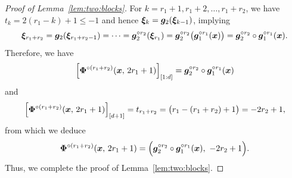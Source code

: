 \documentclass[nohyperref]{article}
\theoremstyle{plain}
\theoremstyle{definition}
\theoremstyle{remark}
\begin{document}
\begin{proof}[Proof of Lemma~\ref{lem:two:blocks}]
		For $k=r_1+1,r_1+2,\dotsc,r_1+r_2$, we have $t_k=2(r_1-k)+1\le -1$ and hence ${\bm{\xi}}_k={\bm{g}}_2({\bm{\xi}}_{k-1})$, implying
		\begin{equation*}
			{\bm{\xi}}_{r_1+r_2}={\bm{g}}_2({\bm{\xi}}_{r_1+r_2-1})=\mathinner{\mkern-0.1mu\cdotp\mkern-0.3mu\cdotp\mkern-0.3mu\cdotp\mkern-0.1mu}={\bm{g}}_2^{\circ r_2}({\bm{\xi}}_{r_1})
			={\bm{g}}_2^{\circ r_2}\big({\bm{g}}_1^{\circ r_1}({\bm{x}})\big)
			={\bm{g}}_2^{\circ r_2}\circ {\bm{g}}_1^{\circ r_1}({\bm{x}}).
		\end{equation*}
		Therefore, we have
		\begin{equation*}
			\Big[{\bm{\Phi}}^{\circ (r_1+r_2)}({\bm{x}},\,2r_1+1)\Big]_{[1:d]}={\bm{g}}_2^{\circ r_2}\circ {\bm{g}}_1^{\circ r_1}({\bm{x}})
		\end{equation*} 
	and
	\begin{equation*}
		\Big[{\bm{\Phi}}^{\circ (r_1+r_2)}({\bm{x}},\,2r_1+1)\Big]_{[d+1]}=t_{r_1+r_2}=\big(r_1-(r_1+r_2)+1\big)=-2r_2+1,
	\end{equation*}
	from which we deduce
	\begin{equation*}
		{\bm{\Phi}}^{\circ (r_1+r_2)}({\bm{x}},\,2r_1+1)=\Big({\bm{g}}_2^{\circ r_2}\circ {\bm{g}}_1^{\circ r_1}({\bm{x}}),\  -2r_2+1\Big).
	\end{equation*}
	Thus, we complete the proof of Lemma~\ref{lem:two:blocks}.
	\end{proof}
	
\end{document}
